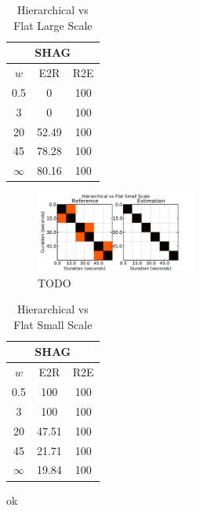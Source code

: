 \documentclass{article}
\begin{document}
\begin{table}
 \begin{center}
   \begin{tabular}{|c|c|c|}
  \hline
  \multicolumn{3}{|c|}{\textbf{SHAG}} \\
  \hline
  $w$       & E2R    & R2E      \\
  \hline
  0.5       & 0         & 100      \\     
  3         & 0         & 100      \\
  20        & 52.49     & 100    \\
  45        & 78.28     & 100    \\
  $\infty$  & 80.16     & 100    \\
  \hline
 \end{tabular}
\end{center}
  \caption{Hierarchical vs Flat Large Scale}
  \label{tab:hier-flatlarge}
\end{table}

\begin{figure}
  \centering
  \includegraphics[width=0.47\textwidth]{plots/hier-flatsmall.pdf}
  \caption{TODO}
  \label{fig:hier-flatsmall}
\end{figure}%

\begin{table}
 \begin{center}
   \begin{tabular}{|c|c|c|}
  \hline
  \multicolumn{3}{|c|}{\textbf{SHAG}} \\
  \hline
  $w$       & E2R    & R2E      \\
  \hline
  0.5       & 100       & 100      \\     
  3         & 100       & 100      \\
  20        & 47.51     & 100    \\
  45        & 21.71     & 100    \\
  $\infty$  & 19.84     & 100    \\
  \hline
 \end{tabular}
\end{center}
  \caption{Hierarchical vs Flat Small Scale}
  \label{tab:hier-flatsmall}
\end{table}
ok
\end{document}
